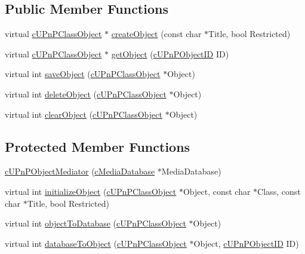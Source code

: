 \subsection*{Public Member Functions}
\begin{CompactItemize}
\item 
virtual \hyperlink{classcUPnPClassObject}{cUPnPClassObject} $\ast$ \hyperlink{classcUPnPObjectMediator_bfbca3f1cbadacee2b21306364750f26}{createObject} (const char $\ast$Title, bool Restricted)
\item 
virtual \hyperlink{classcUPnPClassObject}{cUPnPClassObject} $\ast$ \hyperlink{classcUPnPObjectMediator_5b4fff612476fb51690919f9c59899a5}{getObject} (\hyperlink{structcUPnPObjectID}{cUPnPObjectID} ID)
\item 
virtual int \hyperlink{classcUPnPObjectMediator_c200f88239b8940d9d38cbe04c3e961e}{saveObject} (\hyperlink{classcUPnPClassObject}{cUPnPClassObject} $\ast$Object)
\item 
virtual int \hyperlink{classcUPnPObjectMediator_0d2f9d72a678002456cbdeccb2c6e5fe}{deleteObject} (\hyperlink{classcUPnPClassObject}{cUPnPClassObject} $\ast$Object)
\item 
virtual int \hyperlink{classcUPnPObjectMediator_9ab720e86c6d6cb397799ac5070f70aa}{clearObject} (\hyperlink{classcUPnPClassObject}{cUPnPClassObject} $\ast$Object)
\end{CompactItemize}
\subsection*{Protected Member Functions}
\begin{CompactItemize}
\item 
\hyperlink{classcUPnPObjectMediator_1bc635808c95f6bd774046c37b8139a1}{cUPnPObjectMediator} (\hyperlink{classcMediaDatabase}{cMediaDatabase} $\ast$MediaDatabase)
\item 
virtual int \hyperlink{classcUPnPObjectMediator_a5a3c6d0fd0cff8c74e6fc40d723290f}{initializeObject} (\hyperlink{classcUPnPClassObject}{cUPnPClassObject} $\ast$Object, const char $\ast$Class, const char $\ast$Title, bool Restricted)
\item 
virtual int \hyperlink{classcUPnPObjectMediator_c44c010895f92adc63af2a2d34cf34c8}{objectToDatabase} (\hyperlink{classcUPnPClassObject}{cUPnPClassObject} $\ast$Object)
\item 
virtual int \hyperlink{classcUPnPObjectMediator_07a6a1d2694fb2f4573bd50374406b24}{databaseToObject} (\hyperlink{classcUPnPClassObject}{cUPnPClassObject} $\ast$Object, \hyperlink{structcUPnPObjectID}{cUPnPObjectID} ID)
\end{CompactItemize}
